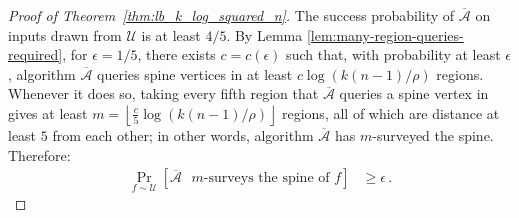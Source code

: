 \documentclass[11pt]{article}
\begin{document}
\begin{proof}[Proof of Theorem~\ref{thm:lb_k_log_squared_n}]
\begin{comment} Consider arbitrary  $h^{\vec{s}, \gamma} \in \mathcal{F}$. For each $t \in \mathbb{N}$, let $W_t$ be the set of queries issued by $\overline{\mathcal{A}}$ on input $h^{\vec{s}, \gamma}$ by the end of  time $t$. A spine vertex $v$ queried by  $\overline{\mathcal{A}}$ on input $h^{\vec{s}, \gamma}$ is  \emph{isolated}  (with respect to input $h^{\vec{s}, \gamma}$) 
if there exist $a, b \in \mathbb{N}$ such that:
\begin{itemize}
    \item $a + 3\rho \leq wt(v) < b$.
    \item For all $u \in W_t$, we have $wt(u) \not\in [a, a+3\rho)$ and $wt(u) \not\in [b, b+3\rho)$.
    \item No spine vertex $u \in W_t$ besides $v$ satisfies $wt(u) \in [a+3\rho, b)$.
\end{itemize}

We say that an input function $h^{\vec{s}, \gamma}$ is \emph{good} if, during the execution of $\overline{\mathcal{A}}$ on $h^{\vec{s}, \gamma}$, there are at least $\frac{1}{2}(c \log m - 1)$ isolated spine vertices, where $ m = \left \lceil \frac{k(n-1)}{\lfloor d \sqrt{kn} \cdot \rho \rfloor} \right \rceil\,.$
\end{comment}

The success probability of $\overline{\mathcal{A}}$ on inputs drawn from $\mathcal{U}$ is at least $4/5$. By Lemma \ref{lem:many-region-queries-required}, for $\epsilon = 1/5$, there exists $c = c(\epsilon)$ such that, with probability at least $\epsilon$, algorithm $\overline{\mathcal{A}}$ queries spine vertices in at least $c \log (k(n-1)/\rho)$ regions. Whenever it does so, taking every fifth region that $\overline{\mathcal{A}}$ queries a spine vertex in gives at least $m = \left \lfloor \frac{c}{5} \log(k(n-1)/\rho)\right\rfloor$ regions, all of which are distance at least $5$ from each other; in other words, algorithm  $\overline{\mathcal{A}}$ has $m$-surveyed the spine. Therefore:
\begin{align}
    \Pr_{f \sim \mathcal{U}} \left[\text{$\overline{\mathcal{A}}$ $m$-surveys the spine of $f$} \right] &\geq \epsilon \,. 
    \label{eq:abar-likely-to-survey-spine}
\end{align}
%


\end{proof}
\end{document}
